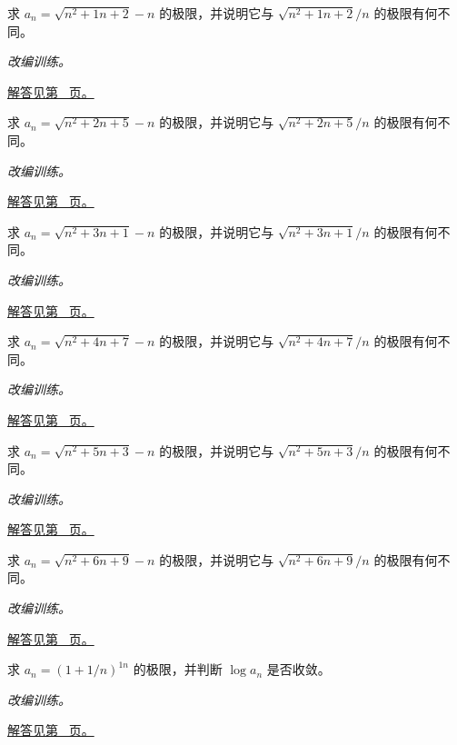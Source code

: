 \documentclass[UTF8,12pt,a4paper,fontset=fandol]{ctexart}
\begin{document}
\begin{example}[根式差的有理化]\label{ex:c1q7}
求 $a_n=\sqrt{n^2+1n+2}-n$ 的极限，并说明它与 $\sqrt{n^2+1n+2}/n$ 的极限有何不同。
\par\textit{改编训练。}\par\hyperref[ans:c1q7]{解答见第~\pageref{ans:c1q7} 页。}
\end{example}
\begin{example}[根式差的有理化]\label{ex:c1q8}
求 $a_n=\sqrt{n^2+2n+5}-n$ 的极限，并说明它与 $\sqrt{n^2+2n+5}/n$ 的极限有何不同。
\par\textit{改编训练。}\par\hyperref[ans:c1q8]{解答见第~\pageref{ans:c1q8} 页。}
\end{example}
\begin{example}[根式差的有理化]\label{ex:c1q9}
求 $a_n=\sqrt{n^2+3n+1}-n$ 的极限，并说明它与 $\sqrt{n^2+3n+1}/n$ 的极限有何不同。
\par\textit{改编训练。}\par\hyperref[ans:c1q9]{解答见第~\pageref{ans:c1q9} 页。}
\end{example}
\begin{example}[根式差的有理化]\label{ex:c1q10}
求 $a_n=\sqrt{n^2+4n+7}-n$ 的极限，并说明它与 $\sqrt{n^2+4n+7}/n$ 的极限有何不同。
\par\textit{改编训练。}\par\hyperref[ans:c1q10]{解答见第~\pageref{ans:c1q10} 页。}
\end{example}
\begin{example}[根式差的有理化]\label{ex:c1q11}
求 $a_n=\sqrt{n^2+5n+3}-n$ 的极限，并说明它与 $\sqrt{n^2+5n+3}/n$ 的极限有何不同。
\par\textit{改编训练。}\par\hyperref[ans:c1q11]{解答见第~\pageref{ans:c1q11} 页。}
\end{example}
\begin{example}[根式差的有理化]\label{ex:c1q12}
求 $a_n=\sqrt{n^2+6n+9}-n$ 的极限，并说明它与 $\sqrt{n^2+6n+9}/n$ 的极限有何不同。
\par\textit{改编训练。}\par\hyperref[ans:c1q12]{解答见第~\pageref{ans:c1q12} 页。}
\end{example}
\begin{example}[指数型数列]\label{ex:c1q13}
求 $a_n=(1+1/n)^{1n}$ 的极限，并判断 $\log a_n$ 是否收敛。
\par\textit{改编训练。}\par\hyperref[ans:c1q13]{解答见第~\pageref{ans:c1q13} 页。}
\end{example}
\end{document}
